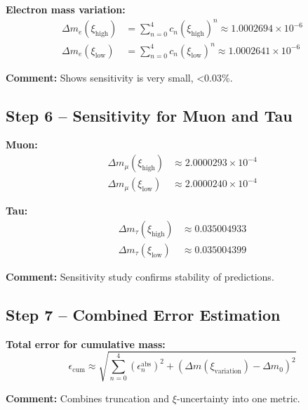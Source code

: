 \documentclass[12pt,a4paper]{article}
\begin{document}
\textbf{Electron mass variation:}
\begin{align}
	\Delta m_e(\xi_\text{high}) &= \sum_{n=0}^{4} c_n (\xi_\text{high})^n \approx 1.0002694 \times 10^{-6} \\
	\Delta m_e(\xi_\text{low}) &= \sum_{n=0}^{4} c_n (\xi_\text{low})^n \approx 1.0002641 \times 10^{-6}
\end{align}

\textbf{Comment:} Shows sensitivity is very small, <0.03\%.

\subsection{Step 6 – Sensitivity for Muon and Tau}

\textbf{Muon:}
\begin{align}
	\Delta m_\mu(\xi_\text{high}) &\approx 2.0000293 \times 10^{-4} \\
	\Delta m_\mu(\xi_\text{low}) &\approx 2.0000240 \times 10^{-4}
\end{align}

\textbf{Tau:}
\begin{align}
	\Delta m_\tau(\xi_\text{high}) &\approx 0.035004933 \\
	\Delta m_\tau(\xi_\text{low}) &\approx 0.035004399
\end{align}

\textbf{Comment:} Sensitivity study confirms stability of predictions.

\subsection{Step 7 – Combined Error Estimation}

\textbf{Total error for cumulative mass:}
\begin{equation}
	\epsilon_\text{cum} \approx \sqrt{\sum_{n=0}^{4} (\epsilon_n^\text{abs})^2 + (\Delta m(\xi_\text{variation}) - \Delta m_0)^2}
\end{equation}

\textbf{Comment:} Combines truncation and $\xi$-uncertainty into one metric.

\end{document}

